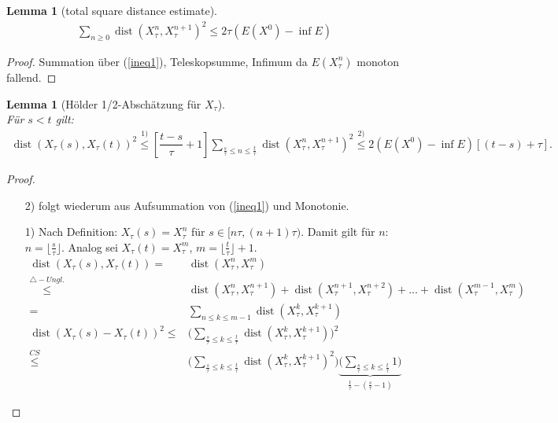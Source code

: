 \documentclass[11pt,a4paper,notitlepage]{scrreprt}
\newcommand{\dist}{\operatorname{dist}}
\newtheorem{lem}[defi]{Lemma}
\begin{document}
\begin{lem}[total square distance estimate]
\begin{eqnarray}
\sum_{n\geq 0}\dist(X_\tau^n,X_\tau^{n+1})^2\leq 2\tau (E(X^0)-\inf E)\label{totalsquare}
\end{eqnarray}
\end{lem}
\begin{proof}
Summation über (\ref{ineq1}), Teleskopsumme, Infimum da $E(X_\tau^n)$ monoton fallend.
\end{proof}

\begin{lem}[Hölder 1/2-Abschätzung für $X_\tau$]  $~~$ \\
Für $s<t$ gilt:
\begin{eqnarray}
\dist(X_\tau(s),X_\tau(t))^2 \overset{1)}\leq \left[\dfrac{t-s}{\tau}+1\right] \sum_{\frac{s}{\tau}\leq n \leq \frac{t}{\tau}} \dist (X^n_\tau, X_\tau^{n+1})^2 \overset{2)}\leq 2(E(X^0)-\inf E)[(t-s)+\tau]. \label{Hölder}
\end{eqnarray}
\end{lem}

\begin{proof}
\begin{itemize}
\item[2)] folgt wiederum aus Aufsummation von (\ref{ineq1}) und Monotonie.
\item[1)] Nach Definition: $X_\tau(s)=X_\tau^n$ für $s\in [n\tau,(n+1)\tau)$. Damit gilt für $n$: $n=\lfloor \frac{s}{	\tau}\rfloor$. Analog sei $X_\tau(t)=X_\tau^m$, $m=\lfloor\frac{t}{\tau}\rfloor+1$.\\
\begin{align*}
\dist(X_\tau(s),X_\tau(t))=&\dist(X_\tau^n,X_\tau^m)\\\overset{\triangle -Ungl.}\leq&\dist(X_\tau^n,X_\tau^{n+1})+\dist(X_\tau^{n+1},X_\tau^{n+2})+...+\dist(X_\tau^{m-1},X_\tau^m)\\
=&\sum_{n\leq k\leq m-1}\dist(X_\tau^k,X_\tau^{k+1})\\
\dist(X_\tau(s)-X_\tau(t))^2\leq&\Bigg(\sum_{\frac{s}{\tau}\leq k\leq \frac{t}{\tau}}\dist(X_\tau^k,X_\tau^{k+1})\Bigg)^2 \\ \overset{CS}\leq&\Bigg(\sum_{\frac{s}{\tau}\leq k\leq \frac{t}{\tau}}\dist(X_\tau^k,X_\tau^{k+1})^2\Bigg)\underset{\frac{t}{\tau}-(\frac{s}{\tau}-1)}{\underbrace{\Bigg(\sum_{\frac{s}{\tau}\leq k\leq \frac{t}{\tau}}1\Bigg)}}
\end{align*}
\end{itemize}
\end{proof}
\end{document}
